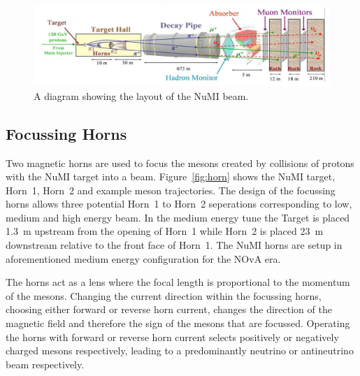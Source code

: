 
\begin{figure}
  \centering
  \includegraphics[width=1\textwidth]{../../img/beam/beam_diagram.png} 
  \caption{A diagram showing the layout of the NuMI beam. \cite{NuMI}}
  \label{fig:NuMI}
\end{figure}

\subsection{Focussing Horns}

Two magnetic horns are used to focus the mesons created 
by collisions of protons with the NuMI target into a
beam. Figure~\ref{fig:horn} shows the NuMI target, Horn~1, Horn~2 and
example meson trajectories. 
The design of the focussing horns allows three potential
Horn~1 to Horn~2 seperations corresponding to low, medium and high
energy beam. 
In the medium energy tune the Target is placed 1.3~m upstream from the
opening of Horn~1 while 
Horn~2 is placed 23~m downstream relative to the front face of Horn~1.
The NuMI horns are setup in aforementioned medium energy configuration
for the NOvA era.

The horns act as a lens where the focal
length is proportional to the momentum of the mesons.
Changing the current
direction within the focussing horns, choosing either forward or
reverse horn current, changes the direction of
the magnetic field and therefore the sign
of the mesons that are focussed. Operating the horns with forward or
reverse horn current selects positively or negatively charged mesons
respectively, leading to a predominantly neutrino or antineutrino beam
respectively. 

